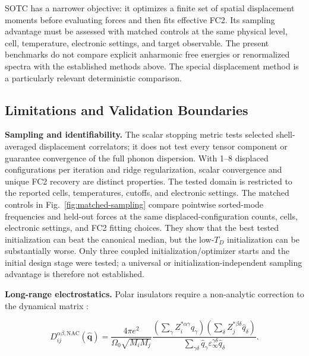 \documentclass[aps,prb,reprint,amsmath,amssymb,floatfix]{revtex4-2}
\begin{document}
\color{revisionblue}
SOTC has a narrower objective: it optimizes a finite set of spatial displacement
moments before evaluating forces and then fits effective FC2. Its sampling
advantage must be assessed with matched controls at the same physical level,
cell, temperature, electronic settings, and target observable. The present
benchmarks do not compare explicit anharmonic free energies or renormalized
spectra with the established methods above. The special displacement method
\cite{ref42} is a particularly relevant deterministic comparison.
\color{black}

\color{revisionblue}
\subsection{Limitations and Validation Boundaries}\label{limitations-and-validation-boundaries}
\color{black}

\color{revisionblue}
\textbf{Sampling and identifiability.} The scalar stopping metric tests selected
shell-averaged displacement correlators; it does not test every tensor component
or guarantee convergence of the full phonon dispersion. With 1--8 displaced
configurations per iteration and ridge regularization, scalar convergence and
unique FC2 recovery are distinct properties. The tested domain is restricted
to the reported cells, temperatures, cutoffs, and electronic settings.
The matched controls in Fig.~\ref{fig:matched-sampling} compare pointwise
sorted-mode frequencies and held-out forces at the same displaced-configuration
counts, cells, electronic settings, and FC2 fitting choices. They show that the
best tested initialization can beat the canonical median, but the low-\(T_D\)
initialization can be substantially worse. Only three coupled
initialization/optimizer starts and the initial design stage were tested; a
universal or initialization-independent sampling advantage is therefore not
established.
\color{black}

\color{revisionblue}
\textbf{Long-range electrostatics.} Polar insulators require a non-analytic
correction to the dynamical matrix \cite{ref39}:
\color{black}

\color{revisionblue}
\begin{equation*}
D_{ij}^{\alpha\beta,\text{NAC}}(\hat{\mathbf{q}}) = \frac{4\pi e^2}{\Omega_0\sqrt{M_iM_j}} \frac{(\sum_\gamma Z_i^{*\alpha\gamma}\hat{q}_\gamma)(\sum_\delta Z_j^{*\beta\delta}\hat{q}_\delta)}{\sum_{\gamma\delta}\hat{q}_\gamma\varepsilon_\infty^{\gamma\delta}\hat{q}_\delta}.
\end{equation*}
\color{black}
\end{document}
